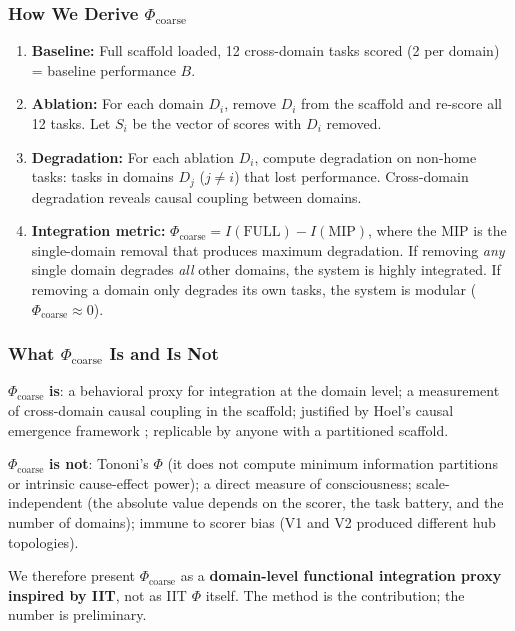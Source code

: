 \documentclass[12pt,letterpaper]{article}
\begin{document}
\subsubsection{How We Derive $\Phi_{\text{coarse}}$}

\begin{enumerate}
  \item \textbf{Baseline:} Full scaffold loaded, 12 cross-domain tasks scored (2 per domain) = baseline performance $B$.
  \item \textbf{Ablation:} For each domain $D_i$, remove $D_i$ from the scaffold and re-score all 12 tasks. Let $S_i$ be the vector of scores with $D_i$ removed.
  \item \textbf{Degradation:} For each ablation $D_i$, compute degradation on non-home tasks: tasks in domains $D_j$ ($j \neq i$) that lost performance. Cross-domain degradation reveals causal coupling between domains.
  \item \textbf{Integration metric:} $\Phi_{\text{coarse}} = I(\text{FULL}) - I(\text{MIP})$, where the MIP is the single-domain removal that produces maximum degradation. If removing \emph{any} single domain degrades \emph{all} other domains, the system is highly integrated. If removing a domain only degrades its own tasks, the system is modular ($\Phi_{\text{coarse}} \approx 0$).
\end{enumerate}

\subsubsection{What $\Phi_{\text{coarse}}$ Is and Is Not}

$\Phi_{\text{coarse}}$ \textbf{is}: a behavioral proxy for integration at the domain level; a measurement of cross-domain causal coupling in the scaffold; justified by Hoel's causal emergence framework \citep{hoel2017map, hoel2013macro}; replicable by anyone with a partitioned scaffold.

$\Phi_{\text{coarse}}$ \textbf{is not}: Tononi's $\Phi$ (it does not compute minimum information partitions or intrinsic cause-effect power); a direct measure of consciousness; scale-independent (the absolute value depends on the scorer, the task battery, and the number of domains); immune to scorer bias (V1 and V2 produced different hub topologies).

We therefore present $\Phi_{\text{coarse}}$ as a \textbf{domain-level functional integration proxy inspired by IIT}, not as IIT $\Phi$ itself. The method is the contribution; the number is preliminary.
\end{document}
